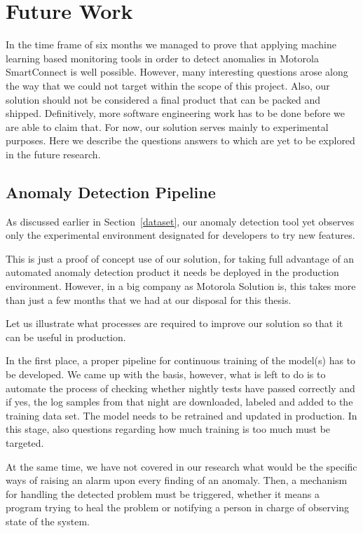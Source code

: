 \section{Future Work}
In the time frame of six months we managed to prove that applying machine learning based monitoring tools in order to detect anomalies in Motorola SmartConnect is well possible.
However, many interesting questions arose along the way that we could not target within the scope of this project.
Also, our solution should not be considered a final product that can be packed and shipped. Definitively, more software engineering work has to be done before we are able to claim that. For now, our solution serves mainly to experimental purposes.
Here we describe the questions answers to which are yet to be explored in the future research.

\subsection{Anomaly Detection Pipeline}
\label{future:pipeline}
As discussed earlier in Section~\ref{dataset}, our anomaly detection tool yet observes only the experimental environment designated for developers to try new features. 

This is just a proof of concept use of our solution, for taking full advantage of an automated anomaly detection product it needs be deployed in the production environment. However, in a big company as Motorola Solution is, this takes more than just a few months that we had at our disposal for this thesis.

Let us illustrate what processes are required to improve our solution so that it can be useful in production.

In the first place, a proper pipeline for continuous training of the model(s) has to be developed. We came up with the basis, however, what is left to do is to automate the process of checking whether nightly tests have passed correctly and if yes, the log samples from that night are downloaded, labeled and added to the training data set. The model needs to be retrained and updated in production. In this stage, also questions regarding how much training is too much must be targeted.

At the same time, we have not covered in our research what would be the specific ways of raising an alarm upon every finding of an anomaly. Then, a mechanism for handling the detected problem must be triggered, whether it means a program trying to heal the problem or notifying a person in charge of observing state of the system.


